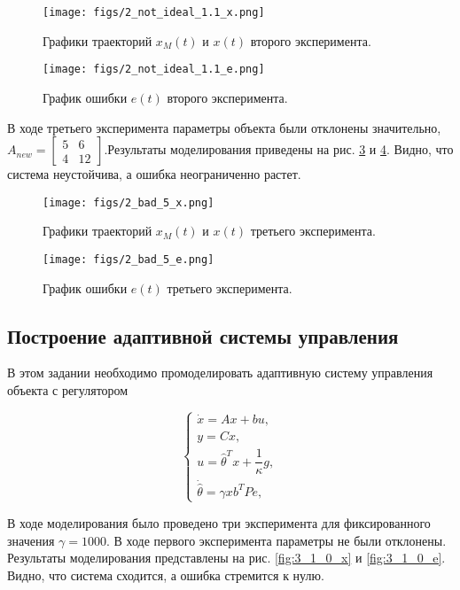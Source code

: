 \documentclass{article}
\begin{document}
\begin{figure}[h!]
  \centering
  \texttt{[image: figs/2\_not\_ideal\_1.1\_x.png]}
  \caption{Графики траекторий $x_M(t)$ и $x(t)$ второго эксперимента.} 
  \label{fig:2_not_ideal_1.1_x}
\end{figure}

\begin{figure}[h!]
  \centering
  \texttt{[image: figs/2\_not\_ideal\_1.1\_e.png]}
  \caption{График ошибки $e(t)$ второго эксперимента.} 
  \label{fig:2_not_ideal_1.1_e}
\end{figure}
\FloatBarrier

В ходе третьего эксперимента параметры объекта были отклонены значительно, $A_{new} =\begin{bmatrix} 5 & 6 \\ 4 & 12\end{bmatrix}$.Результаты моделирования приведены на рис. \ref{fig:2_bad_5_x} и \ref{fig:2_bad_5_e}. Видно, что система неустойчива, а ошибка неограниченно растет.

\begin{figure}[h!]
  \centering
  \texttt{[image: figs/2\_bad\_5\_x.png]}
  \caption{Графики траекторий $x_M(t)$ и $x(t)$ третьего эксперимента.} 
  \label{fig:2_bad_5_x}
\end{figure}

\begin{figure}[h!]
  \centering
  \texttt{[image: figs/2\_bad\_5\_e.png]}
  \caption{График ошибки $e(t)$ третьего эксперимента.} 
  \label{fig:2_bad_5_e}
\end{figure}
\FloatBarrier

\FloatBarrier
\subsection{Построение адаптивной системы управления}
В этом задании необходимо промоделировать адаптивную систему управления объекта с регулятором

$$
\begin{cases}
    \dot x = Ax + bu, \\
    y = Cx, \\
    u = \hat\theta^T x + \dfrac{1}{\kappa}g, \\
    \dot{\hat \theta} = \gamma x b^T P e,
\end{cases}
$$

В ходе моделирования было проведено три эксперимента для фиксированного значения $\gamma = 1000$. В ходе первого эксперимента параметры не были отклонены. Результаты моделирования представлены на рис. \ref{fig:3_1_0_x} и \ref{fig:3_1_0_e}. Видно, что система сходится, а ошибка стремится к нулю.
\end{document}

